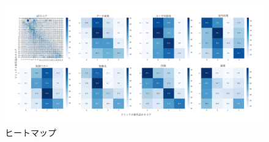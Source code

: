 \documentclass[submit,techrep,noauthor]{ipsj}
\def\|{\verb|}
\begin{document}
\begin{figure}[t]
  \centering
  \includegraphics[width=\textwidth]{@IPSJ_SIGSE202511_Horio/heatmap.pdf}
  \caption{ヒートマップ}
  \label{heatmap}
\end{figure}

% %2
% \section{投稿の流れ}

% %2.1
% \subsection{準備}

% 情報処理学会論文誌ジャーナルの\LaTeX スタイルファイルを含む論文執筆キットは
% \begin{quote}
% \small
% \|http://www.ipsj.or.jp/jip/submit/style.html|
\end{document}
